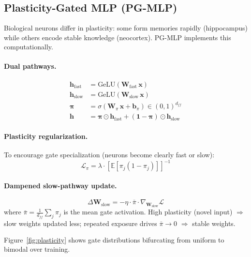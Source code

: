 \documentclass[11pt,a4paper]{article}
\theoremstyle{plain}
\theoremstyle{definition}
\theoremstyle{remark}
\newcommand{\E}{\mathbb{E}}
\newcommand{\pibar}{\bar{\pi}}
\begin{document}
\subsection{Plasticity-Gated MLP (PG-MLP)}
\label{sec:pgmlp}

Biological neurons differ in plasticity: some form memories rapidly (hippocampus) while others encode stable knowledge (neocortex). PG-MLP implements this computationally.

\paragraph{Dual pathways.}
\begin{align}
  \mathbf{h}_\text{fast} &= \text{GeLU}(\mathbf{W}_\text{fast}\,\mathbf{x}) \\
  \mathbf{h}_\text{slow} &= \text{GeLU}(\mathbf{W}_\text{slow}\,\mathbf{x}) \\
  \boldsymbol{\pi}       &= \sigma(\mathbf{W}_\pi\,\mathbf{x} + \mathbf{b}_\pi) \in (0,1)^{d_{ff}} \\
  \mathbf{h}             &= \boldsymbol{\pi} \odot \mathbf{h}_\text{fast} + (\mathbf{1} - \boldsymbol{\pi}) \odot \mathbf{h}_\text{slow}
\end{align}

\paragraph{Plasticity regularization.}
To encourage gate specialization (neurons become clearly fast or slow):
\begin{equation}
  \mathcal{L}_\pi = \lambda \cdot \left[\E\!\left[\pi_j(1 - \pi_j)\right]\right]^{-1}
\end{equation}

\paragraph{Dampened slow-pathway update.}
\begin{equation}
  \Delta\mathbf{W}_\text{slow} = -\eta \cdot \pibar \cdot \nabla_{\mathbf{W}_\text{slow}} \mathcal{L}
\end{equation}
where $\pibar = \frac{1}{d_{ff}}\sum_j \pi_j$ is the mean gate activation. High plasticity (novel input) $\Rightarrow$ slow weights updated less; repeated exposure drives $\pibar \to 0$ $\Rightarrow$ stable weights.

Figure~\ref{fig:plasticity} shows gate distributions bifurcating from uniform to bimodal over training.
\end{document}
